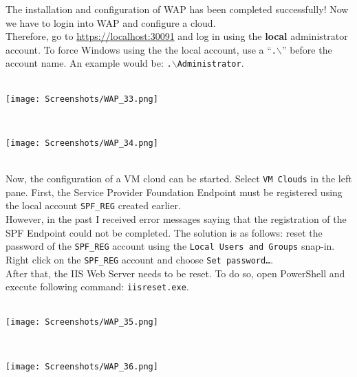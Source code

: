 The installation and configuration of WAP has been completed successfully! Now we have to login into WAP and configure a cloud. \\
Therefore, go to \url{https://localhost:30091} and log in using the \textbf{local} administrator account. To force Windows using the the local account, use a ``\texttt{.$\backslash$}'' before the account name. An example would be: \texttt{.$\backslash$Administrator}.
$\;$ \\ \\
\noindent\begin{minipage}{\textwidth}
    \centering
    \texttt{[image: Screenshots/WAP\_33.png]}
\end{minipage}
$\;$ \\ \\
\noindent\begin{minipage}{\textwidth}
    \centering
    \texttt{[image: Screenshots/WAP\_34.png]}
\end{minipage}
$\;$ \\ \\
Now, the configuration of a VM cloud can be started. Select \texttt{VM Clouds} in the left pane. First, the Service Provider Foundation Endpoint must be registered using the local account \texttt{SPF\_REG} created earlier. \\
However, in the past I received error messages saying that the registration of the SPF Endpoint could not be completed. The solution is as follows: reset the password of the \texttt{SPF\_REG} account using the \texttt{Local Users and Groups} snap-in. Right click on the \texttt{SPF\_REG} account and choose \texttt{Set password\ldots}. \\
After that, the IIS Web Server needs to be reset. To do so, open PowerShell and execute following command: \texttt{iisreset.exe}.
$\;$ \\ \\
\noindent\begin{minipage}{\textwidth}
    \centering
    \texttt{[image: Screenshots/WAP\_35.png]}
\end{minipage}
$\;$ \\ \\
\noindent\begin{minipage}{\textwidth}
    \centering
    \texttt{[image: Screenshots/WAP\_36.png]}
\end{minipage}
